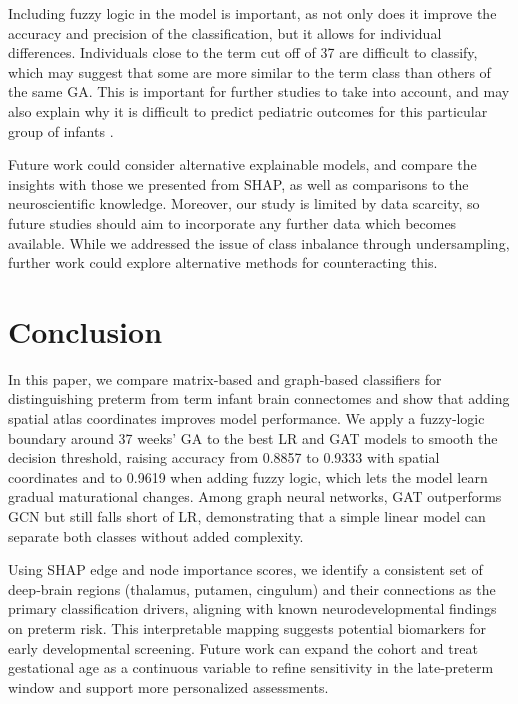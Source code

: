 \documentclass[doubleblind]{ecai}
\begin{document}

Including fuzzy logic in the model is important, as not only does it improve the accuracy and precision of the classification, but it allows for individual differences. Individuals close to the term cut off of 37 are difficult to classify, which may suggest that some are more similar to the term class than others of the same GA. This is important for further studies to take into account, and may also explain why it is difficult to predict pediatric outcomes for this particular group of infants \cite{engle2006recommendation,karnati2020late}.

Future work could consider alternative explainable models, and compare the insights with those we presented from SHAP, as well as comparisons to the neuroscientific knowledge. Moreover, our study is limited by data scarcity, so future studies should aim to incorporate any further data which becomes available. While we addressed the issue of class inbalance through undersampling, further work could explore alternative methods for counteracting this.   



\section{Conclusion}


In this paper, we compare matrix‑based and graph‑based classifiers for distinguishing preterm from term infant brain connectomes and show that adding spatial atlas coordinates improves model performance. We apply a fuzzy‑logic boundary around 37 weeks’ GA to the best LR and GAT models to smooth the decision threshold, raising accuracy from 0.8857 to 0.9333 with spatial coordinates and to 0.9619 when adding fuzzy logic, which lets the model learn gradual maturational changes. Among graph neural networks, GAT outperforms GCN but still falls short of LR, demonstrating that a simple linear model can separate both classes without added complexity.

Using SHAP edge and node importance scores, we identify a consistent set of deep‑brain regions (thalamus, putamen, cingulum) and their connections as the primary classification drivers, aligning with known neurodevelopmental findings on preterm risk. This interpretable mapping suggests potential biomarkers for early developmental screening. Future work can expand the cohort and treat gestational age as a continuous variable to refine sensitivity in the late‑preterm window and support more personalized assessments.
\end{document}
